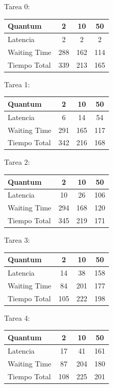 \begin{center}

Tarea 0: \newline
\begin{tabular}{| l | c | c | c |}
\hline  
\textbf{Quantum} & \textbf{2} & \textbf{10} & \textbf{50} \\ \hline
Latencia & 2 & 2 & 2 \\ \hline
Waiting Time & 288 & 162 & 114 \\ \hline
Tiempo Total & 339 & 213 & 165 \\ \hline
\end{tabular}


Tarea 1: \newline
\begin{tabular}{| l | c | c | c |}
\hline  
\textbf{Quantum} & \textbf{2} & \textbf{10} & \textbf{50} \\ \hline
Latencia & 6 & 14 & 54 \\ \hline
Waiting Time & 291 & 165 & 117 \\ \hline
Tiempo Total & 342 & 216 & 168 \\ \hline
\end{tabular}

Tarea 2: \newline
\begin{tabular}{| l | c | c | c |}
\hline  
\textbf{Quantum} & \textbf{2} & \textbf{10} & \textbf{50} \\ \hline
Latencia & 10 & 26 & 106 \\ \hline
Waiting Time & 294 & 168 & 120 \\ \hline
Tiempo Total & 345 & 219 & 171 \\ \hline
\end{tabular}

Tarea 3: \newline
\begin{tabular}{| l | c | c | c |}
\hline  
\textbf{Quantum} & \textbf{2} & \textbf{10} & \textbf{50} \\ \hline
Latencia & 14 & 38 & 158 \\ \hline
Waiting Time & 84 & 201 & 177 \\ \hline
Tiempo Total & 105 & 222 & 198 \\ \hline
\end{tabular}

Tarea 4: \newline
\begin{tabular}{| l | c | c | c |}
\hline  
\textbf{Quantum} & \textbf{2} & \textbf{10} & \textbf{50} \\ \hline
Latencia & 17 & 41 & 161 \\ \hline
Waiting Time & 87 & 204 & 180 \\ \hline
Tiempo Total & 108 & 225 & 201 \\ \hline
\end{tabular}


\end{center}
